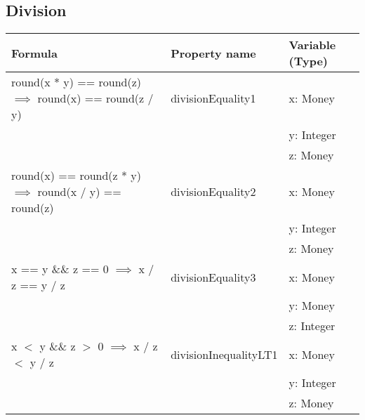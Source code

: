 \subsection*{Division}
\label{ssct:properties_division_updated}
\FloatBarrier
\begin{table}[!ht]
\centering
\begin{tabular}{lll}
\hline
                        \textbf{Formula}                                             & \textbf{Property name} & \textbf{Variable (Type)} \\ \hline
\rowcolor[HTML]{EFEFEF} round(x * y) == round(z) $\implies$ round(x) == round(z / y) & divisionEquality1      & x: Money                 \\
\rowcolor[HTML]{EFEFEF}                                                              &                        & y: Integer               \\
\rowcolor[HTML]{EFEFEF}                                                              &                        & z: Money                 \\
                        round(x) == round(z * y) $\implies$ round(x / y) == round(z) & divisionEquality2      & x: Money                 \\
                                                                                     &                        & y: Integer               \\
                                                                                     &                        & z: Money                 \\
\rowcolor[HTML]{EFEFEF} x == y \&\& z == 0 $\implies$ x / z == y / z                 & divisionEquality3      & x: Money                 \\
\rowcolor[HTML]{EFEFEF}                                                              &                        & y: Money                 \\
\rowcolor[HTML]{EFEFEF}                                                              &                        & z: Integer               \\
												x $<$ y \&\& z $>$ 0 $\implies$ x / z $<$ y / z              & divisionInequalityLT1  & x: Money                 \\
																																										 &                        & y: Integer               \\
																																										 &                        & z: Money                 \\

\end{tabular}
\end{table}

